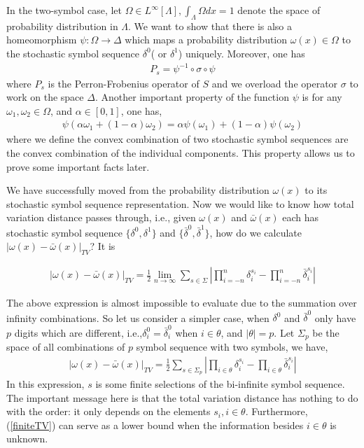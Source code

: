 \documentclass{article}
\begin{document}
In the two-symbol case, let $\Omega\in L^\infty[\Lambda], \int_\Lambda \Omega dx=1$ denote the space of probability distribution in $\Lambda$. We want to show that there is also a homeomorphism $\psi: \Omega \rightarrow \Delta $ which maps a probability distribution $\omega(x) \in \Omega$ to the stochastic symbol sequence $\delta^0$( or $\delta^1$) uniquely. Moreover, one has
 \begin{eqnarray}
 P_s= \psi^{-1}\circ \sigma \circ \psi
 \end{eqnarray}
where $P_s$ is the Perron-Frobenius operator of $S$ and we overload the operator $\sigma$ to work on the space $\Delta$. Another important property of the function $\psi$ is for any $\omega_1, \omega_2 \in \Omega$, and $\alpha\in[0,1]$, one has,
 \begin{eqnarray}
 \label{psiislinear}
  \psi(\alpha\omega_1+(1-\alpha)\omega_2) = \alpha\psi(\omega_1)+(1-\alpha)\psi(\omega_2)
 \end{eqnarray}
where we define the convex combination of two stochastic symbol sequences are the convex combination of the individual components. This property allows us to prove some important facts later. 
 
We have successfully moved from the probability distribution $\omega(x)$ to its stochastic symbol sequence representation. Now we would like to know how total variation distance passes through, i.e., given $\omega(x)$ and $\bar{\omega}(x)$ each has stochastic symbol sequence $\{\delta^0, \delta^1\}$ and $\{\bar{\delta}^0,\bar{\delta}^1 \}$, how do we calculate $|\omega(x)-\bar{\omega}(x)|_{TV}$? It is

 \begin{eqnarray}
 \label{infiniteTV}
|\omega(x)-\bar{\omega}(x)|_{TV} = \frac{1}{2} \lim_{n \rightarrow \infty}  \sum_{s\in\Sigma} \left| \prod_{i=-n}^n\delta_i^{s_i}-\prod_{i=-n}^n\bar{\delta}_i^{s_i}  \right| 
 \end{eqnarray}

The above expression is almost impossible to evaluate due to the summation over infinity combinations. So let us consider a simpler case, when $\delta^0$ and $\bar{\delta}^0$ only have $p$ digits which are different, i.e.,$\delta_i^0 = \bar{\delta}_i^0$ when $i\in \theta$, and $|\theta| = p$. Let $\Sigma_p$ be the space of all combinations of $p$ symbol sequence with two symbols, we have,
   \begin{eqnarray}
  \label{finiteTV}
|\omega(x)-\bar{\omega}(x)|_{TV} = \frac{1}{2} \sum_{s\in\Sigma_p}  \left| \prod_{i\in \theta}\delta_i^{s_i}-\prod_{i\in\theta}\bar{\delta}_i^{s_i}  \right| 
 \end{eqnarray}
In this expression, $s$ is some finite selections of the bi-infinite symbol sequence. The important message here is that the total variation distance has nothing to do with the order: it only depends on the elements $s_i, i\in\theta$. Furthermore, (\ref{finiteTV})  can serve as a lower bound when the information besides $i\in \theta$ is unknown.  
\end{document}
